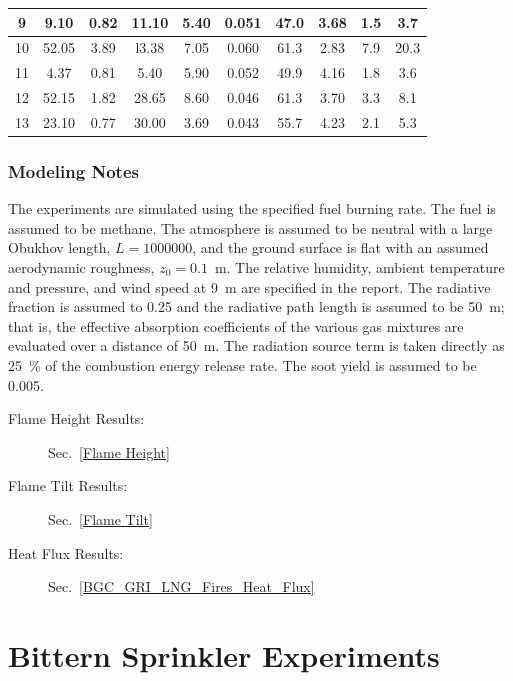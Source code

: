 \begin{table}[!ht]
\begin{tabular}{|c|c|c|c|c|c|c|c|c|c|}
9     & 9.10       & 0.82      & 11.10   & 5.40        & 0.051             & 47.0        & 3.68        & 1.5         & 3.7         \\ \hline
10    & 52.05      & 3.89      & l3.38   & 7.05        & 0.060             & 61.3        & 2.83        & 7.9         & 20.3        \\ \hline
11    & 4.37       & 0.81      & 5.40    & 5.90        & 0.052             & 49.9        & 4.16        & 1.8         & 3.6         \\ \hline
12    & 52.15      & 1.82      & 28.65   & 8.60        & 0.046             & 61.3        & 3.70        & 3.3         & 8.1         \\ \hline
13    & 23.10      & 0.77      & 30.00   & 3.69        & 0.043             & 55.7        & 4.23        & 2.1         & 5.3         \\ \hline
\end{tabular}
\end{table}

\subsubsection{Modeling Notes}

The experiments are simulated using the specified fuel burning rate. The fuel is assumed to be methane. The atmosphere is assumed to be neutral with a large Obukhov length, $L=1000000$, and the ground surface is flat with an assumed aerodynamic roughness, $z_0=0.1$~m. The relative humidity, ambient temperature and pressure, and wind speed at 9~m are specified in the report. The radiative fraction is assumed to 0.25 and the radiative path length is assumed to be 50~m; that is, the effective absorption coefficients of the various gas mixtures are evaluated over a distance of 50~m. The radiation source term is taken directly as 25~\% of the combustion energy release rate. The soot yield is assumed to be 0.005.

\begin{description}
\item[Flame Height Results:] Sec.~\ref{Flame Height} 
\item[Flame Tilt Results:] Sec.~\ref{Flame Tilt} 
\item[Heat Flux Results:] Sec.~\ref{BGC_GRI_LNG_Fires_Heat_Flux} 
\end{description}

\FloatBarrier


\section{Bittern Sprinkler Experiments}
\label{Bittern_Sprinkler_Description}

